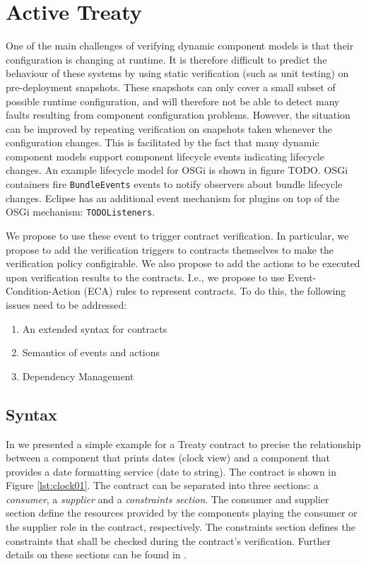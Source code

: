 \documentclass{llncs}
\begin{document}
\section{Active Treaty}

One of the main challenges of verifying dynamic component models is that their configuration is changing at runtime. It is therefore difficult to predict the behaviour of these systems by using static verification (such as unit testing) on pre-deployment snapshots. These snapshots can only cover a small subset of possible runtime configuration, and will therefore not be able to detect many faults resulting from component configuration problems. However, the situation can 
be improved by repeating verification on snapshots taken whenever the configuration changes. This is facilitated by the fact that many dynamic component models support component lifecycle  events indicating lifecycle changes. 
An example lifecycle model for OSGi is shown in figure TODO. OSGi containers fire \texttt{BundleEvents} events to notify observers about bundle lifecycle changes. Eclipse has an additional event mechanism for plugins on top of the OSGi mechanism: \texttt{TODOListeners}.  

We propose to use these event to trigger contract verification. In particular, we propose to add the verification triggers to contracts themselves to make the verification policy configirable. We also propose to add the actions to be executed 
upon verification results to the contracts. I.e., we propose to use Event-Condition-Action (ECA) rules to represent contracts. To do this, the following issues need to be addressed:

\begin{enumerate}
\item An extended syntax for contracts
\item Semantics of events and actions
\item Dependency Management
\end{enumerate}


\subsection{Syntax}

In \cite{Treaty.JOT2009} we presented a simple example for a Treaty contract to precise the relationship between a component that prints
dates (clock view) and a component that provides a date formatting service (date to string). The contract is shown in Figure \ref{lst:clock01}. The contract can be separated into three sections: a \textit{consumer}, a \textit{supplier} and a \textit{constraints section}. The consumer and supplier section define the resources provided by the components playing the consumer or the supplier role in the contract, respectively. The constraints section defines the constraints that shall be checked during the contract's verification. Further details on these sections can be found in \cite{Treaty.JOT2009}.
\end{document}
